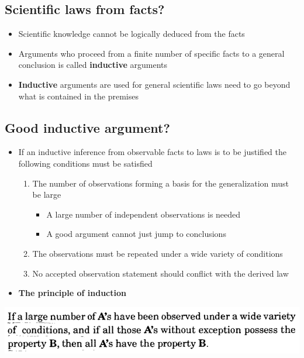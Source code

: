 \documentclass[11pt]{article}
\begin{document}
\subsection{Scientific laws from facts?}
\label{sec:org87ba4b7}
\begin{itemize}
\item Scientific knowledge cannot be logically deduced from the facts
\item Arguments who proceed from a finite number of specific facts to a general conclusion is called \textbf{inductive} arguments
\item \textbf{Inductive} arguments are used for general scientific laws need to go beyond what is contained in the premises
\end{itemize}

\subsection{Good inductive argument?}
\label{sec:org927cbc0}
\begin{itemize}
\item If an inductive inference from observable facts to laws is to be justified the following conditions must be satisfied
\begin{enumerate}
\item The number of observations forming a basis for the generalization must be large
\begin{itemize}
\item A large number of independent observations is needed
\item A good argument cannot just jump to conclusions
\end{itemize}
\item The observations must be repeated under a wide variety of conditions
\item No accepted observation statement should conflict with the derived law
\end{enumerate}

\item \textbf{The principle of induction}
\end{itemize}
\begin{center}
\includegraphics[width=.9\linewidth]{Induction/screenshot_2019-01-27_15-24-02.png}
\end{center}
\end{document}
